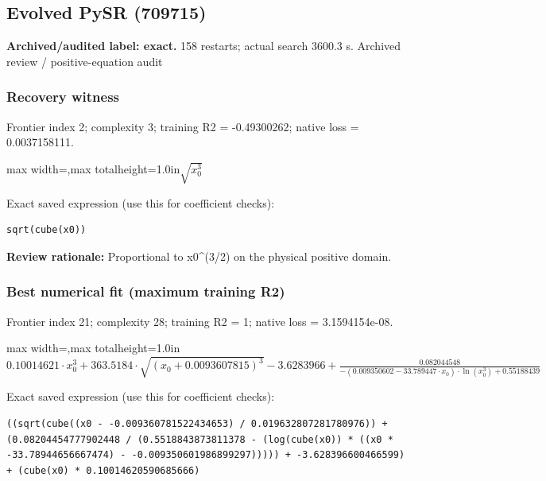 \documentclass[10pt,letterpaper,landscape]{article}
\begin{document}
\begin{minipage}[t]{0.485\textwidth}
\subsection*{Evolved PySR (709715)}
\textbf{Archived/audited label: exact.} 158 restarts; actual search 3600.3 s.
{\small Archived review / positive-equation audit}
\subsubsection*{Recovery witness}
Frontier index 2; complexity 3; training R2 = -0.49300262; native loss = 0.0037158111.
\begin{center}\begin{adjustbox}{max width=\linewidth,max totalheight=1.0in}$\displaystyle \sqrt{x_{0}^{3}}$\end{adjustbox}\end{center}
{\scriptsize Exact saved expression (use this for coefficient checks):}
\begin{lstlisting}
sqrt(cube(x0))
\end{lstlisting}
{\small\textbf{Review rationale:} Proportional to x0\textasciicircum{}(3/2) on the physical positive domain.}
\subsubsection*{Best numerical fit (maximum training R2)}
Frontier index 21; complexity 28; training R2 = 1; native loss = 3.1594154e-08.
\begin{center}\begin{adjustbox}{max width=\linewidth,max totalheight=1.0in}$\displaystyle 0.10014621 \cdot x_{0}^{3} + 363.5184 \cdot \sqrt{\left(x_{0} + 0.0093607815\right)^{3}} - 3.6283966 + \frac{0.082044548}{- \left(0.009350602 - 33.789447 \cdot x_{0}\right) \cdot \ln{\left(x_{0}^{3} \right)} + 0.55188439}$\end{adjustbox}\end{center}
{\scriptsize Exact saved expression (use this for coefficient checks):}
\begin{lstlisting}
((sqrt(cube((x0 - -0.009360781522434653) / 0.019632807281780976)) + (0.08204454777902448 / (0.5518843873811378 - (log(cube(x0)) * ((x0 * -33.78944656667474) - -0.009350601986899297))))) + -3.628396600466599) + (cube(x0) * 0.10014620590685666)
\end{lstlisting}
\end{minipage}
\clearpage{}\label{kepler-10004}
\end{document}
